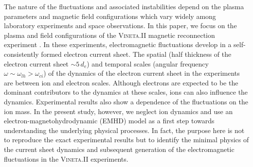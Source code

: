 \documentclass[aip,preprint]{revtex4-1}
\begin{document}
The nature of the fluctuations and associated instabilities depend on the plasma parameters and magnetic field configurations which vary widely among laboratory experiments and space observations. In this paper, we focus on the plasma and field configurations of the \textsc{Vineta}.II magnetic reconnection experiment \cite{stechow2016}. In these experiments, electromagnetic fluctuations develop in a self-consistently formed electron current sheet. The spatial (half thickness of the electron current sheet $\sim 5\,d_e$) and temporal scales (angular frequency $ \omega \sim \omega_{lh} > \omega_{ci}$)
of the dynamics of the electron current sheet in the experiments are between ion and electron scales. Although electrons are expected to be the dominant contributors to the dynamics at these scales, ions can also influence the dynamics. Experimental results also show a dependence of the fluctuations on the ion mass. In the present study, however, we neglect ion dynamics and use an electron-magnetohydrodynamic (EMHD) model as a first step towards understanding the underlying physical processes. In fact, the purpose here is not to reproduce the exact experimental results but to identify the minimal physics of the current sheet dynamics and subsequent generation of the electromagnetic fluctuations in the \textsc{Vineta}.II experiments.


\end{document}

